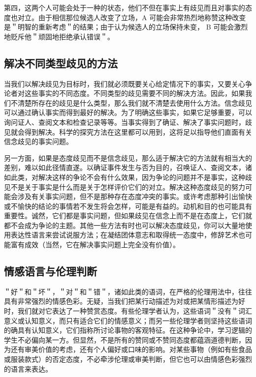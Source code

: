 第四，这两个人可能会处于一种的状态，他们不但在事实上有歧见而且对事实的态度也对立。由于相信那位候选人改变了立场，A 可能会非常热烈地称赞这种改变是＂明智的重新考虑＂的结果；由于认为候选人的立场保持未变， B 可能会激烈地贬斥他＂顽固地拒绝承认错误＂。

\subsection{解决不同类型歧见的方法}

当我们以解决歧见为目标时，我们就必须既要关心给定情况下的事实，又要关心争论者对这些事实的不同态度。不同类型的歧见需要不同的解决方法。因此，如果我们不清楚所存在的歧见是什么类型，那么我们就不清楚去使用什么方法。信念歧见可以通过确认事实而得到最好的解决。为了明确这些事实，如果它足够重要，可以询问证人、查阅文本和检查记录等等。当事实得到了确证、解决了事实问题时，歧见就会得到解决。科学的探究方法在这里都可以用到，这将足以指导他们直面有关信念歧见的事实问题。

另一方面，如果是态度歧见而不是信念歧见，那么适于解决它的方法就有相当大的差别，难以如此径情直遂。以确证事件发生与否为目的，召唤证人、查阅文本，诸如此类，对解决这样的争论不会有什么效果，因为争论的问题并不是事实，这种歧见不是关于事实是什么而是关于怎样评价它们的对立。解决这种态度歧见的努力可能会涉及有关事实问题，但不是那种存在态度冲突的事实。或许考虑那种引出愉快或不愉快的结论的事情若不发生将会怎样，可能是有益的。动机和目的也可能具有重要性。诚然，它们都是事实问题，但如果歧见在信念上而不是在态度上，它们就都不会成为争论的主题。其他一些方法有时也可以解决态度歧见，你可以大量地使用表达性语言来尝试说服方法；在凝结团体意志和取得统一态度中，修辞艺术也可能富有成效（当然，它在解决事实问题上完全没有价值）。

\subsection{情感语言与伦理判断}

＂好＂和＂坏＂，＂对＂和＂错＂，诸如此类的语词，在严格的伦理用法中，往往具有非常强烈的情感色彩。无疑，当我们把某行动描述为对或把某情形描述为好时，我们就对它表达了一种赞赏态度。有些伦理学者认为，这些语词＂没有＂词汇意义或认知意义，而只有适合它们的情感意义；而另一些伦理学者则坚持这些语词的确具有认知意义，它们指称所讨论事物的客观特征。在这种争论中，学习逻辑的学生不必偏向某一方。但显然，不是所有的赞同或不赞同态度都蕴涵道德判断，因为还有审美价值的考虑，还有个人偏好或口味的影响。对某些事物（例如有些食品或服装款式）的否定态度，不必牵涉伦理或审美判断，但它也可以由情感色彩强烈的语言来表达。

